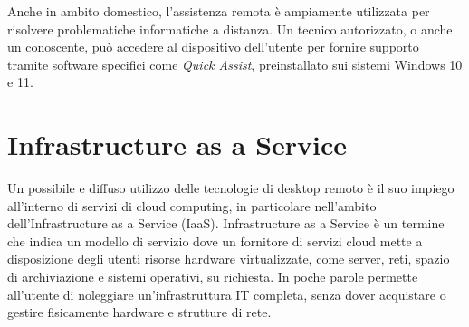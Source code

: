 \documentclass[12pt,a4paper,openright,twoside]{book}
\begin{document}
Anche in ambito domestico, l'assistenza remota è ampiamente utilizzata per risolvere problematiche informatiche a distanza. Un tecnico autorizzato, o anche un conoscente, può accedere al dispositivo dell’utente per fornire supporto tramite software specifici come \textit{Quick Assist}, preinstallato sui sistemi Windows 10 e 11.



\section{Infrastructure as a Service}
\label{sec:iaas}
Un possibile e diffuso utilizzo delle tecnologie di desktop remoto è il suo impiego all'interno di servizi di cloud computing, in particolare nell'ambito dell'Infrastructure as a Service (IaaS).
Infrastructure as a Service è un termine che indica un modello di servizio dove un fornitore di servizi cloud mette a disposizione degli utenti risorse hardware virtualizzate, come server, reti, spazio di archiviazione e sistemi operativi, su richiesta. In poche parole permette all'utente di noleggiare un'infrastruttura IT completa, senza dover acquistare o gestire fisicamente hardware e strutture di rete.
\end{document}
